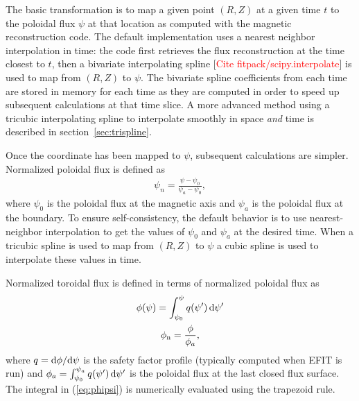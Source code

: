 \documentclass[12pt,floatfix,showpacs]{revtex4-1}
\newcommand{\diff}{\ensuremath\mathrm{d}}
\newcommand{\note}[1]{\textcolor{red}{#1}}
\begin{document}
The basic transformation is to map a given point $(R, Z)$ at a given time $t$ to the poloidal flux $\psi$ at that location as computed with the magnetic reconstruction code.
The default implementation uses a nearest neighbor interpolation in time: the code first retrieves the flux reconstruction at the time closest to $t$, then a bivariate interpolating spline [\note{Cite fitpack/scipy.interpolate}] is used to map from $(R, Z)$ to $\psi$.
The bivariate spline coefficients from each time are stored in memory for each time as they are computed in order to speed up subsequent calculations at that time slice.
A more advanced method using a tricubic interpolating spline to interpolate smoothly in space \emph{and} time is described in section~\ref{sec:trispline}.

Once the coordinate has been mapped to $\psi$, subsequent calculations are simpler.
Normalized poloidal flux is defined as
\begin{gather}
	\psi_{n} = \frac{\psi - \psi_{0}}{\psi_{a} - \psi_{0}},
\end{gather}
where $\psi_{0}$ is the poloidal flux at the magnetic axis and $\psi_{a}$ is the poloidal flux at the boundary.
To ensure self-consistency, the default behavior is to use nearest-neighbor interpolation to get the values of $\psi_{0}$ and $\psi_{a}$ at the desired time.
When a tricubic spline is used to map from $(R, Z)$ to $\psi$ a cubic spline is used to interpolate these values in time.

Normalized toroidal flux is defined in terms of normalized poloidal flux as
\begin{gather}
	\phi(\psi) = \int_{\psi_{0}}^{\psi} q(\psi')\,\diff\psi'\label{eq:phipsi}\\
	\phi_{\text{n}} = \frac{\phi}{\phi_{a}},
\end{gather}
where $q = \diff\phi/\diff\psi$ is the safety factor profile (typically computed when EFIT is run) and $\phi_{a}=\int_{\psi_{0}}^{\psi_{a}}q(\psi')\,\diff\psi'$ is the poloidal flux at the last closed flux surface.
The integral in (\ref{eq:phipsi}) is numerically evaluated using the trapezoid rule.
\end{document}
